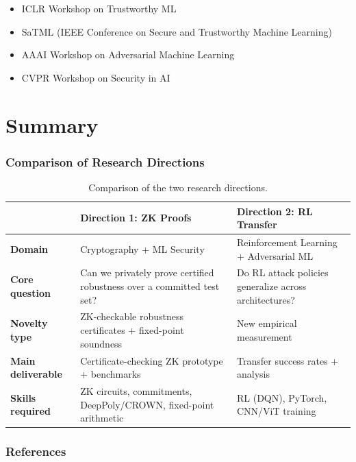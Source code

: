 \documentclass[11pt,a4paper]{article}
\begin{document}
\begin{itemize}
    \item ICLR Workshop on Trustworthy ML
    \item SaTML (IEEE Conference on Secure and Trustworthy Machine Learning)
    \item AAAI Workshop on Adversarial Machine Learning
    \item CVPR Workshop on Security in AI
\end{itemize}

\newpage
\part{Summary}

\section{Comparison of Research Directions}

\begin{table}[H]
\centering
\begin{tabular}{@{}lp{5.5cm}p{5.5cm}@{}}
\toprule
& \textbf{Direction 1: ZK Proofs} & \textbf{Direction 2: RL Transfer} \\
\midrule
\textbf{Domain} & Cryptography + ML Security & Reinforcement Learning + Adversarial ML \\
\textbf{Core question} & Can we privately prove certified robustness over a committed test set? & Do RL attack policies generalize across architectures? \\
\textbf{Novelty type} & ZK-checkable robustness certificates + fixed-point soundness & New empirical measurement \\
\textbf{Main deliverable} & Certificate-checking ZK prototype + benchmarks & Transfer success rates + analysis \\
\textbf{Skills required} & ZK circuits, commitments, DeepPoly/CROWN, fixed-point arithmetic & RL (DQN), PyTorch, CNN/ViT training \\
\bottomrule
\end{tabular}
\caption{Comparison of the two research directions.}
\end{table}

\newpage
\section*{References}
\end{document}
